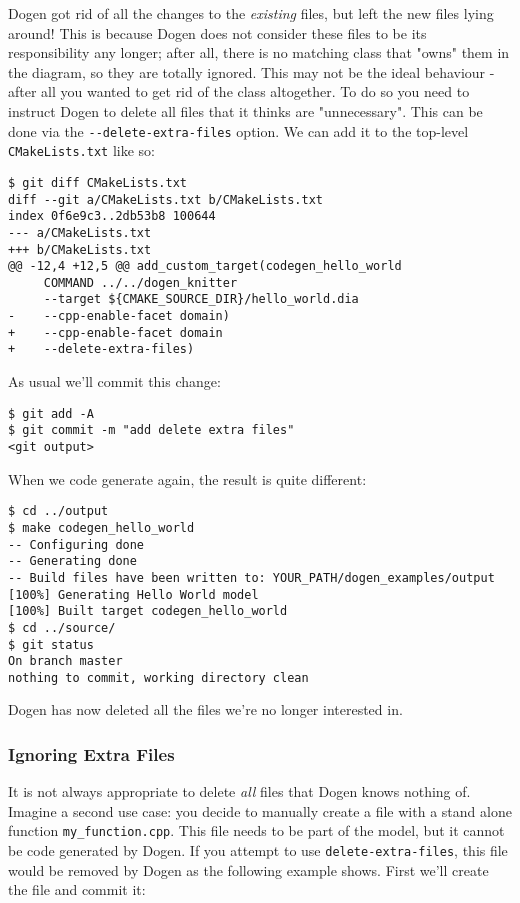 \documentclass[11pt]{article}
\begin{document}
Dogen got rid of all the changes to the \emph{existing} files, but left the
new files lying around! This is because Dogen does not consider these
files to be its responsibility any longer; after all, there is no
matching class that "owns" them in the diagram, so they are totally
ignored. This may not be the ideal behaviour - after all you wanted to
get rid of the class altogether. To do so you need to instruct Dogen
to delete all files that it thinks are "unnecessary". This can be done
via the \texttt{-{}-delete-extra-files} option. We can add it to the top-level
\texttt{CMakeLists.txt} like so:

\begin{verbatim}
$ git diff CMakeLists.txt
diff --git a/CMakeLists.txt b/CMakeLists.txt
index 0f6e9c3..2db53b8 100644
--- a/CMakeLists.txt
+++ b/CMakeLists.txt
@@ -12,4 +12,5 @@ add_custom_target(codegen_hello_world
     COMMAND ../../dogen_knitter
     --target ${CMAKE_SOURCE_DIR}/hello_world.dia
-    --cpp-enable-facet domain)
+    --cpp-enable-facet domain
+    --delete-extra-files)
\end{verbatim}

As usual we'll commit this change:

\begin{verbatim}
$ git add -A
$ git commit -m "add delete extra files"
<git output>
\end{verbatim}

When we code generate again, the result is quite different:

\begin{verbatim}
$ cd ../output
$ make codegen_hello_world
-- Configuring done
-- Generating done
-- Build files have been written to: YOUR_PATH/dogen_examples/output
[100%] Generating Hello World model
[100%] Built target codegen_hello_world
$ cd ../source/
$ git status
On branch master
nothing to commit, working directory clean
\end{verbatim}

Dogen has now deleted all the files we're no longer interested in.

\subsubsection{Ignoring Extra Files}
\label{sec-3-2-8}

It is not always appropriate to delete \emph{all} files that Dogen knows
nothing of. Imagine a second use case: you decide to manually create a
file with a stand alone function \texttt{my\_function.cpp}. This file needs to
be part of the model, but it cannot be code generated by Dogen. If you
attempt to use \texttt{delete-extra-files}, this file would be removed by
Dogen as the following example shows. First we'll create the file and
commit it:
\end{document}
